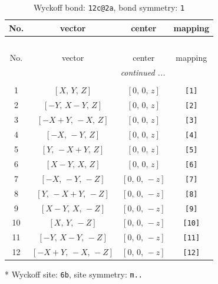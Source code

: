 \documentclass[fleqn,8pt]{jsarticle}
\begin{document}
\renewcommand{\arraystretch}{1.2}
\begin{longtable}{cccc}
\caption{Wyckoff bond: {\tt 12c@2a}, bond symmetry: {\tt 1}}
 \\
 \hline \hline
No. & vector & center & mapping \\ \hline \endfirsthead

\multicolumn{3}{l}{\tablename\ \thetable{}} \\
 \hline \hline
No. & vector & center & mapping \\ \hline \endhead

 \hline \hline
\multicolumn{3}{r}{\footnotesize\it continued ...} \\ \endfoot

 \hline \hline
\multicolumn{3}{r}{} \\ \endlastfoot

1 & $\left[ X,\, Y,\, Z \right]$ & $\left[ 0,\, 0,\, z \right]$ & {\tt [1]} \\ \hline
2 & $\left[ - Y,\, X - Y,\, Z \right]$ & $\left[ 0,\, 0,\, z \right]$ & {\tt [2]} \\ \hline
3 & $\left[ - X + Y,\, - X,\, Z \right]$ & $\left[ 0,\, 0,\, z \right]$ & {\tt [3]} \\ \hline
4 & $\left[ - X,\, - Y,\, Z \right]$ & $\left[ 0,\, 0,\, z \right]$ & {\tt [4]} \\ \hline
5 & $\left[ Y,\, - X + Y,\, Z \right]$ & $\left[ 0,\, 0,\, z \right]$ & {\tt [5]} \\ \hline
6 & $\left[ X - Y,\, X,\, Z \right]$ & $\left[ 0,\, 0,\, z \right]$ & {\tt [6]} \\ \hline
7 & $\left[ - X,\, - Y,\, - Z \right]$ & $\left[ 0,\, 0,\, - z \right]$ & {\tt [7]} \\ \hline
8 & $\left[ Y,\, - X + Y,\, - Z \right]$ & $\left[ 0,\, 0,\, - z \right]$ & {\tt [8]} \\ \hline
9 & $\left[ X - Y,\, X,\, - Z \right]$ & $\left[ 0,\, 0,\, - z \right]$ & {\tt [9]} \\ \hline
10 & $\left[ X,\, Y,\, - Z \right]$ & $\left[ 0,\, 0,\, - z \right]$ & {\tt [10]} \\ \hline
11 & $\left[ - Y,\, X - Y,\, - Z \right]$ & $\left[ 0,\, 0,\, - z \right]$ & {\tt [11]} \\ \hline
12 & $\left[ - X + Y,\, - X,\, - Z \right]$ & $\left[ 0,\, 0,\, - z \right]$ & {\tt [12]} \\
\end{longtable}
* Wyckoff site: {\tt 6b}, site symmetry: {\tt m..}
\renewcommand{\arraystretch}{1.2}
\end{document}
